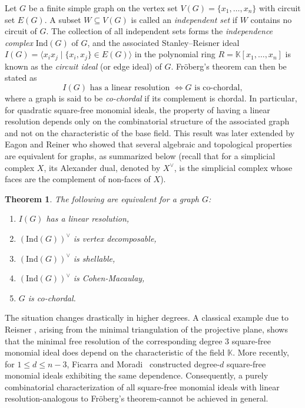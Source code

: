\documentclass[12pt,reqno]{amsart}
\newtheorem{theorem}[proposition]{Theorem}
\theoremstyle{definition}
\def\Ind{\mathrm{Ind}}
\begin{document}
Let $G$ be a finite simple graph on the vertex set $V(G)=\{x_1,\ldots,x_n\}$ with circuit set $E(G)$. A subset $W\subseteq V(G)$ is called an \emph{independent set} if $W$ contains no circuit of $G$. The collection of all independent sets forms the \emph{independence complex} $\mathrm{Ind}(G)$ of $G$, and the associated Stanley--Reisner ideal $I(G)=\langle x_i x_j \mid \{x_i,x_j\}\in E(G)\rangle$ in the polynomial ring $R=\mathbb K[x_1,\ldots,x_n]$ is known as the \emph{circuit ideal} (or edge ideal) of $G$.  
Fr\"oberg’s theorem can then be stated as
	\[
	I(G) \text{ has a linear resolution } \Longleftrightarrow G \text{ is co-chordal},
	\]
where a graph is said to be \emph{co-chordal} if its complement is chordal. In particular, for quadratic square-free monomial ideals, the property of having a linear resolution depends only on the combinatorial structure of the associated graph and not on the characteristic of the base field.
This result was later extended by Eagon and Reiner \cite[Proposition 8]{EagonReiner1998} who showed that several algebraic and topological properties are equivalent for graphs, as summarized below (recall that for a simplicial complex $X$, its Alexander dual, denoted by $X^{\vee}$, is the simplicial complex whose faces are the complement of non-faces of $X$).
\begin{theorem}
    The following are equivalent for a graph $G$:
    \begin{enumerate}
        \item $I(G)$ has a linear resolution,
        \item $(\Ind(G))^{\vee}$ is vertex decomposable,
        \item $(\Ind(G))^{\vee}$ is shellable,
        \item $(\Ind(G))^{\vee}$ is Cohen-Macaulay,
        \item $G$ is co-chordal.
    \end{enumerate}
\end{theorem}

	
The situation changes drastically in higher degrees. 
A classical example due to Reisner \cite{reisner76}, arising from the minimal triangulation of the projective plane, shows that the minimal free resolution of the corresponding degree $3$ square-free monomial ideal does depend on the characteristic of the field $\mathbb{K}$.
More recently, for $1\le d\le n-3$, Ficarra and Moradi~\cite{CEI} constructed degree-$d$ square-free monomial ideals exhibiting the same dependence. 
Consequently, a purely combinatorial characterization of all square-free monomial ideals with linear resolution-analogous to Fr\"oberg’s theorem-cannot be achieved in general.
	
\end{document}
